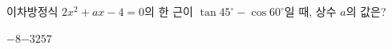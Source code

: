 이차방정식 $2x^2+ax-4=0$의 한 근이 $\tan 45^\circ-\cos 60^\circ$일 때, 상수 $a$의 값은?
\begin{choices32}{$-8$}{$-3$}{$2$}{$5$}{$7$}\end{choices32}
